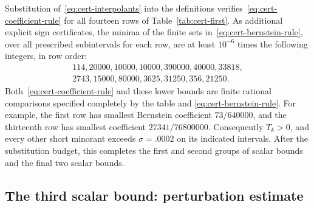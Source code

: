 Substitution of~\eqref{eq:cert-interpolants} into the definitions
verifies~\eqref{eq:cert-coefficient-rule} for all fourteen rows of
Table~\ref{tab:cert-first}.  As additional explicit sign certificates,
the minima of the finite sets in~\eqref{eq:cert-bernstein-rule}, over
all prescribed subintervals for each row, are at least $10^{-6}$ times
the following integers, in row order:
\begin{equation}
\begin{gathered}
 114, 20000, 10000, 10000, 390000, 40000, 33818,\\
 2743, 15000, 80000, 3625, 31250, 356, 21250.
\end{gathered}
\label{eq:cert-first-bernstein-lower}
\end{equation}
Both~\eqref{eq:cert-coefficient-rule} and these lower bounds are finite
rational comparisons specified completely by the table and
\eqref{eq:cert-bernstein-rule}.  For example, the first row has
smallest Bernstein coefficient $73/640000$, and the thirteenth row
has smallest coefficient $27341/76800000$.
Consequently $T_k>0$, and every other short minorant exceeds
$\sigma=.0002$ on its indicated intervals.  After the substitution
budget, this completes the first and second groups of scalar bounds
and the final two scalar bounds.

\subsection{The third scalar bound: perturbation estimate}

